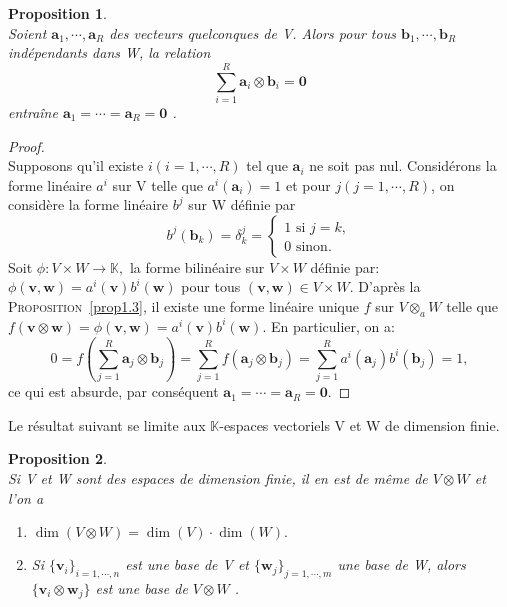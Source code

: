 \documentclass[11pt,a4paper,oneside]{book}
\newtheorem{prop}{Proposition}[chapter]
\newtheorem{proof}{Démonstration}
\def\K{\mathbb K}
\def\ov{\mathbf 0}
\def\a{\mathbf a}
\def\b{\mathbf b}
\def\v{\mathbf v}
\def\z{\mathbf Z}
\def\w{\mathbf w}
\newcommand{\propref}[1]{\textsc{Proposition}~\ref{#1}}
\begin{document}

\begin{prop}
\emph{\\}
Soient $ \a_{1},\cdots,\a_{R} $ des vecteurs quelconques de V. Alors
pour tous $ \b_{1},\cdots,\b_{R} $ indépendants dans W, la relation
$$ \sum_{i=1}^{R}\a_{i}\otimes \b_{i}=\ov$$
entraîne $ \a_{1}=\cdots=\a_{R} =\ov$ \cite[p.11]{Awanegeo}.
\end{prop}

\begin{proof}
\emph{\\}
Supposons qu'il existe $ i(i=1,\cdots,R) $ tel que $ \a_{i} $ ne soit pas nul. Considérons la forme linéaire $ a^{i} $ sur V telle que $ a^{i}(\a_{i})=1 $ et pour $ j(j=1,\cdots,R) $, on considère la forme linéaire $ b^{j} $ sur W définie par
$$b^{j}(\b_{k})=\delta_{k}^{j}=\begin{cases}
1\text{ si } j=k,\\
0\text{ sinon.}
\end{cases} $$
Soit $ \phi:V\times W \rightarrow \K,$ la forme bilinéaire sur $ V\times W $ définie par: $\phi(\v,\w)=a^{i}(\v)b^{i}(\w) $  pour tous $ (\v,\w)\in V\times W $.  D'après la  \propref{prop1.3}, il existe une forme linéaire unique $ f $ sur $ V\otimes_{a} W $ telle que 
$f(\v\otimes\w)=\phi(\v,\w)=a^{i}(\v)b^{i}(\w). $ En particulier, on a:
$$0=f\left(\sum_{j=1}^{R}\a_{j}\otimes \b_{j}\right)=\sum_{j=1}^{R}f(\a_{j}\otimes \b_{j})=\sum_{j=1}^{R}a^{i}(\a_{j})b^{i}(\b_{j}) =1,$$ ce qui est absurde, par conséquent $ \a_{1}=\cdots=\a_{R}=\ov. $
\end{proof}
Le résultat suivant se limite aux $ \K $-espaces vectoriels V et W  de dimension finie. 
\begin{prop}\label{basis}
	\emph{\\}
	Si V et W sont des espaces de dimension finie, il en est de même de $ V\otimes W $ et l'on a
	\begin{enumerate}
	\item[(a)]$ \dim (V\otimes W)=\dim(V)\cdot\dim(W). $
	\item[(b)] Si $ \{\v_{i}\}_{i=1,\cdots,n} $ est une base de V et $ \{\w_{j}\}_{j=1,\cdots,m} $ une base de W, alors $ \{\v_{i}\otimes \w_{j}\}$ est une base de $ V\otimes W$ \cite[p. 53]{hackbusch2012tensor}.
	\end{enumerate}
\end{prop}
	
\end{document}
